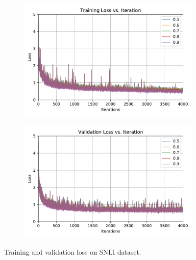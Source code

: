 \documentclass[10pt,twocolumn,letterpaper]{article}
\begin{document}
\begin{figure}
\centering
\begin{subfigure}{.5\textwidth}
  \centering
  \includegraphics[scale=0.45]{train_loss}
  \label{fig:train_loss}
\end{subfigure}%
\begin{subfigure}{.5\textwidth}
  \centering
  \includegraphics[scale=0.45]{dev_loss}
  \label{fig:dev_loss}
\end{subfigure}
\caption{Training and validation loss on SNLI dataset.}
\label{fig:loss}
\end{figure}
\end{document}
